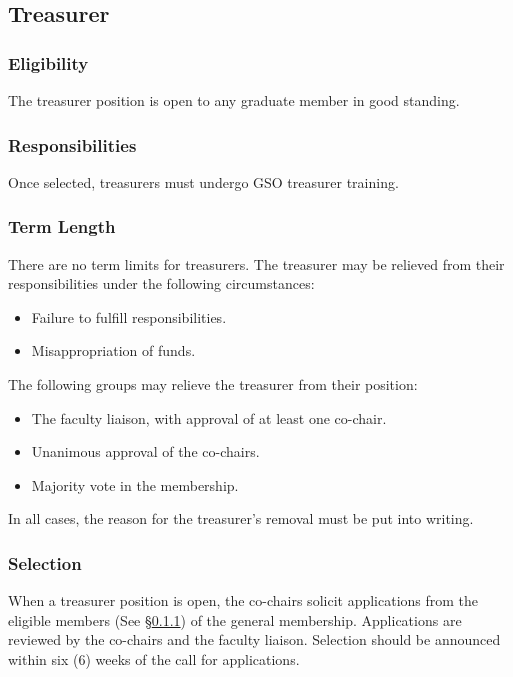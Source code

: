 \subsection{Treasurer}
\label{sec:treasurer}

\subsubsection{Eligibility}
\label{sec:treasurer_eligibility}
The treasurer position is open to any graduate member in good standing.

\subsubsection{Responsibilities}
\label{sec:treasurer_responsibilities}
Once selected, treasurers must undergo GSO treasurer training.

\subsubsection{Term Length}
\label{sec:treasurer_responsibilities}
There are no term limits for treasurers. The treasurer may be relieved from their responsibilities under the following circumstances:
\begin{itemize}
	\item Failure to fulfill responsibilities.
	\item Misappropriation of funds.
\end{itemize}
The following groups may relieve the treasurer from their position:
\begin{itemize}
	\item The faculty liaison, with approval of at least one co-chair.
	\item Unanimous approval of the co-chairs.
	\item Majority vote in the membership.
\end{itemize}
In all cases, the reason for the treasurer's removal must be put into writing.

\subsubsection{Selection}
\label{sec:treasurer_selection}
When a treasurer position is open, the co-chairs solicit applications from the eligible members (See \S\ref{sec:treasurer_eligibility}) of the general membership. Applications are reviewed by the co-chairs and the faculty liaison. Selection should be announced within six (6) weeks of the call for applications.